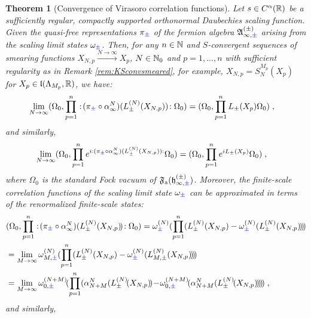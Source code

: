 \documentclass[a4paper, 11pt]{article}
\newcommand{\fA}{\mathfrak{A}}\newcommand{\cA}{\mathcal{A}}\newcommand{\dA}{\mathds{A}}\newcommand{\sA}{\mathscr{A}}
\newcommand{\ua}{\textup a}
\newcommand{\fF}{\mathfrak{F}}\newcommand{\cF}{\mathcal{F}}\newcommand{\dF}{\mathds{F}}\newcommand{\sF}{\mathscr{F}}
\newcommand{\fh}{\mathfrak{h}}
\newcommand{\fl}{\mathfrak{l}}\newcommand{\cl}{\mathcal{l}}
\DeclareMathOperator{\1}{\mathds{1}}
\newtheorem{thm}{Theorem} [section]
\begin{document}
\begin{thm}[Convergence of Virasoro correlation functions]
\label{thm:corapproxvir}
Let $s\in C^{\alpha}(\mathbb{R})$ be a sufficiently regular, compactly supported orthonormal Daubechies scaling function. Given the quasi-free representations $\pi_{{\color{blue}\pm}}$ of the fermion algebra $\fA^{(\pm)}_{\infty,{\color{blue}\pm}}$ arising from the scaling limit states $\omega_{{\color{blue}\pm}}$. Then, for any $n\in\mathbb{N}$ and $S$-convergent sequences of smearing functions $X_{N,p}\stackrel{N\rightarrow\infty}{\rightarrow} X_{p}$, $N\in\mathbb{N}_{0}$ and $p=1,...,n$ with sufficient regularity as in Remark \ref{rem:KSconvsmeared}, for example, $X_{N,p} = S^{M_{p}}_{N}(X_{p})$ for $X_{p}\in\fl(\Lambda_{M_{p}},\R)$, we have:
\begin{align*}
\lim_{N\rightarrow\infty}(\Omega_{0},\prod_{p=1}^{n}:\!(\pi_{{\color{blue}\pm}}\circ\alpha^{N}_{\infty})(L^{(N)}_{\pm}(X_{N,p}))\!:\Omega_{0}) & = (\Omega_{0},\prod_{p=1}^{n}L_{\pm}(X_{p})\Omega_{0})\;,
\end{align*}
and similarly,
\begin{align*}
\lim_{N\rightarrow\infty}(\Omega_{0},\prod_{p=1}^{n}e^{i:(\pi_{{\color{blue}\pm}}\circ\alpha^{N}_{\infty})(L^{(N)}_{\pm}(X_{N,p})):}\Omega_{0}) & = (\Omega_{0},\prod_{p=1}^{n}e^{iL_{\pm}(X_{p})}\Omega_{0})\;,
\end{align*}
where $\Omega_{0}$ is the standard Fock vacuum of $\fF_{\ua}(\fh^{(\pm)}_{\infty,{\color{blue}\pm}})$. Moreover, the finite-scale correlation functions of the scaling limit state $\omega_{{\color{blue}\pm}}$ can be approximated in terms of the renormalized finite-scale states:
\begin{align*}
& (\Omega_{0},\prod_{p=1}^{n}:\!(\pi_{{\color{blue}\pm}}\circ\alpha^{N}_{\infty})(L^{(N)}_{\pm}(X_{N,p})\!)\!:\Omega_{0}) = \omega^{(N)}_{{\color{blue}\pm}}(\prod_{p=1}^{n}(L^{(N)}_{\pm}(X_{N,p})-\omega^{(N)}_{{\color{blue}\pm}}(L^{(N)}_{\pm}(X_{N,p})\!)\!)\!) \\
& = \lim_{M\rightarrow\infty}\omega^{(N)}_{M,{\color{blue}\pm}}(\prod_{p=1}^{n}(L^{(N)}_{\pm}(X_{N,p})-\omega^{(N)}_{{\color{blue}\pm}}(L^{(N)}_{M,\pm}(X_{N,p})\!)\!)\!) \\
& = \lim_{M\rightarrow\infty}\omega^{(N+M)}_{0,{\color{blue}\pm}}\!(\prod_{p=1}^{n}(\alpha^{N}_{N+M}(L^{(N)}_{\pm}\!(X_{N,p})\!)\!-\!\omega^{(N+M)}_{0,{\color{blue}\pm}}\!(\alpha^{N}_{N+M}(L^{(N)}_{\pm}\!(X_{N,p})\!)\!)\!)\!) \;,
\end{align*}
and similarly,
\begin{align*}

\end{align*}
\end{thm}
\end{document}
